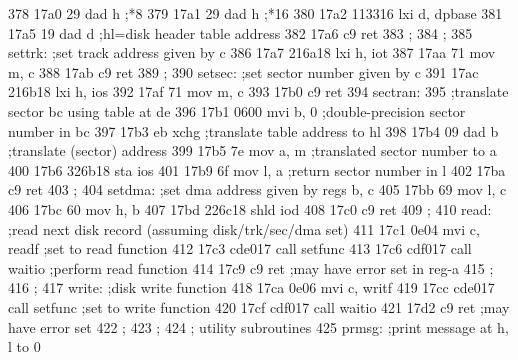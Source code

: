 378      17a0 29                   dad      h          ;*8
379      17a1 29                   dad      h          ;*16
380      17a2 113316               lxi      d, dpbase
381      17a5 19                   dad      d          ;hl=disk header table address
382      17a6 c9                   ret
383                       ;
384                       ;
385                       settrk:  ;set track address given by c
386      17a7 216a18               lxi      h, iot
387      17aa 71                   mov      m, c
388      17ab c9                   ret
389                       ;
390                       setsec:  ;set sector number given by c
391      17ac 216b18               lxi      h, ios
392      17af 71                   mov      m, c
393      17b0 c9                   ret
394                       sectran:
395                                         ;translate sector bc using table at de
396      17b1 0600                 mvi      b, 0       ;double-precision sector number in bc
397      17b3 eb                   xchg                ;translate table address to hl
398      17b4 09                   dad      b          ;translate (sector) address
399      17b5 7e                   mov      a, m       ;translated sector number to a
400      17b6 326b18               sta      ios
401      17b9 6f                   mov      l, a       ;return sector number in l
402      17ba c9                   ret
403                       ;
404                       setdma:  ;set dma address given by regs b, c
405      17bb 69                   mov      l, c
406      17bc 60                   mov      h, b
407      17bd 226c18               shld     iod
408      17c0 c9                   ret
409                       ;
410                       read:    ;read next disk record (assuming disk/trk/sec/dma set)
411      17c1 0e04                 mvi      c, readf   ;set to read function
412      17c3 cde017               call     setfunc
413      17c6 cdf017               call     waitio     ;perform read function
414      17c9 c9                   ret                 ;may have error set in reg-a
415                       ;
416                       ;
417                       write:   ;disk write function
418      17ca 0e06                 mvi      c, writf
419      17cc cde017               call     setfunc    ;set to write function
420      17cf cdf017               call     waitio
421      17d2 c9                   ret                 ;may have error set
422                       ;
423                       ;
424                       ;        utility subroutines
425                       prmsg:   ;print message at h, l to 0

